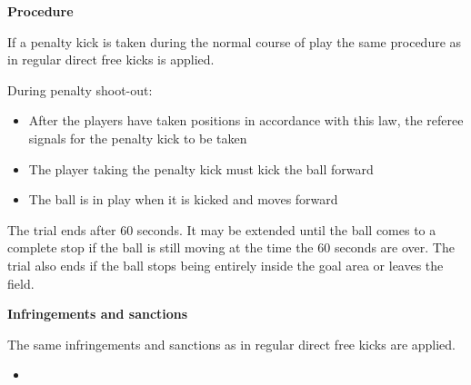 \bigskip

{\bfseries Procedure}

\headlinebox

If a penalty kick is taken during the normal course of play the same procedure
as in regular direct free kicks is applied.

\bigskip
During penalty shoot-out:
\begin{itemize}
\item After the players have taken positions in accordance with this law,
      the referee signals for the penalty kick to be taken
\item The player taking the penalty kick must kick the ball forward
\item The ball is in play when it is kicked and moves forward 
\end{itemize}


\bigskip

The trial ends after 60 seconds.
It may be extended until the ball comes to a complete stop if the ball is still
moving at the time the 60 seconds are over.
The trial also ends if the ball stops being entirely inside the goal area or
leaves the field.

\bigskip


{\bfseries Infringements and sanctions }

\headlinebox

The same infringements and sanctions as in regular direct free kicks are applied.

\bigskip

\begin{itemize}
\item {}
\end{itemize}

